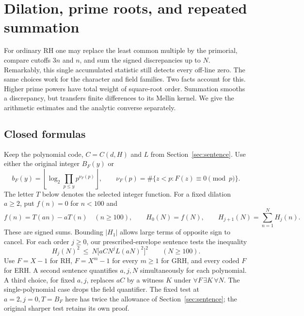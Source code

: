 \section{Dilation, prime roots, and repeated summation}\label{sec:smoothing}

For ordinary RH one may replace the least common multiple by the primorial, compare cutoffs $3n$ and $n$, and sum the signed discrepancies up to $N$. Remarkably, this single accumulated statistic still detects every off-line zero. The same choices work for the character and field families. Two facts account for this. Higher prime powers have total weight of square-root order. Summation smooths a discrepancy, but transfers finite differences to its Mellin kernel. We give the arithmetic estimates and the analytic converse separately.

\subsection*{Closed formulas}

Keep the polynomial code, $C=C(d,H)$ and $L$ from Section~\ref{sec:sentence}. Use either the original integer $B_F(y)$ or
\[
  b_F(y)=\left\lfloor\log_2\prod_{p\le y}p^{\nu_F(p)}\right\rfloor,
  \qquad \nu_F(p)=\#\{z<p:F(z)\equiv0\pmod p\}.
\]
The letter $T$ below denotes the selected integer function. For a fixed dilation $a\ge2$, put $f(n)=0$ for $n<100$ and
\[
 f(n)=T(an)-aT(n)\quad(n\ge100),\qquad H_0(N)=f(N),\qquad
 H_{j+1}(N)=\sum_{n=1}^N H_j(n).
\]
These are signed sums. Bounding $|H_1|$ allows large terms of opposite sign to cancel. For each order $j\ge0$, our prescribed-envelope sentence tests the inequality
\begin{equation}\label{eq:smoothedtest}
       H_j(N)^2\ \le\ N\bigl[a C N^j L(aN)^2\bigr]^2
       \qquad(N\ge100).
\end{equation}
Use $F=X-1$ for RH, $F=X^m-1$ for every $m\ge1$ for GRH, and every coded $F$ for ERH. A second sentence quantifies $a,j,N$ simultaneously for each polynomial. A third choice, for fixed $a,j$, replaces $aC$ by a witness $K$ under $\forall F\,\exists K\,\forall N$. The single-polynomial case drops the field quantifier. The fixed test at $a=2,j=0,T=B_F$ here has twice the allowance of Section~\ref{sec:sentence}; the original sharper test retains its own proof.

